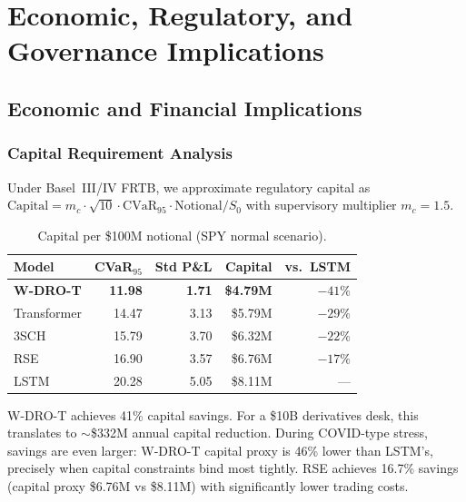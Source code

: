 
\section{Economic, Regulatory, and Governance Implications}
\label{sec:economic}

\subsection{Economic and Financial Implications}

\subsubsection{Capital Requirement Analysis}

Under Basel~III/IV FRTB, we approximate regulatory capital as $\mathrm{Capital} = m_c \cdot \sqrt{10} \cdot \mathrm{CVaR}_{95} \cdot \mathrm{Notional}/S_0$ with supervisory multiplier $m_c = 1.5$.

\begin{table}[H]
\centering\small
\caption{Capital per \$100M notional (SPY normal scenario).}
\label{tab:capital}
\begin{tabular}{@{}lrrrr@{}}
\toprule
\textbf{Model} & \textbf{CVaR$_{95}$} & \textbf{Std P\&L} & \textbf{Capital} & \textbf{vs.\ LSTM} \\\midrule
\textbf{W-DRO-T} & \textbf{11.98} & \textbf{1.71} & \textbf{\$4.79M} & $-41\%$ \\
Transformer & 14.47 & 3.13 & \$5.79M & $-29\%$ \\
3SCH & 15.79 & 3.70 & \$6.32M & $-22\%$ \\
RSE & 16.90 & 3.57 & \$6.76M & $-17\%$ \\
LSTM & 20.28 & 5.05 & \$8.11M & --- \\
\bottomrule
\end{tabular}
\end{table}

W-DRO-T achieves 41\% capital savings. For a \$10B derivatives desk, this translates to $\sim$\$332M annual capital reduction. During COVID-type stress, savings are even larger: W-DRO-T capital proxy is 46\% lower than LSTM's, precisely when capital constraints bind most tightly. RSE achieves 16.7\% savings (capital proxy \$6.76M vs \$8.11M) with significantly lower trading costs.

